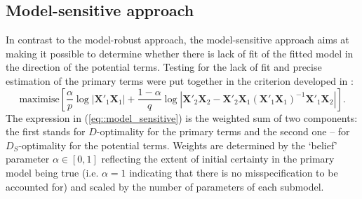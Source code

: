 \subsection{Model-sensitive approach}
In contrast to the model-robust approach, the model-sensitive approach aims at making it possible to determine whether there is lack of fit of the fitted model in the direction of the potential terms. Testing for the lack of fit and precise estimation of the primary terms were put together in the criterion developed in \citet{Atkinson2007}:
\begin{equation}
\label{eq::model_sensitive}
\mbox{maximise} \left[ \frac{\alpha}{p}\log|\bm{X}'_{1}\bm{X}_1|+\frac{1-\alpha}{q}\log|\bm{X}'_{2}\bm{X}_2-\bm{X}'_{2}\bm{X}_1(\bm{X}'_{1}\bm{X}_1)^{-1}\bm{X}'_{1}\bm{X}_2|\right].
\end{equation}
The expression in (\ref{eq::model_sensitive}) is the weighted sum of two components: the first stands for $D$-optimality for the primary terms and the second one -- for $D_S$-optimality for the potential terms. Weights are determined by the `belief' parameter $\alpha\in [0,1]$ reflecting the extent of initial certainty in the primary model being true (i.e. $\alpha=1$ indicating that there is no misspecification to be accounted for) and scaled by the number of parameters of each submodel.

